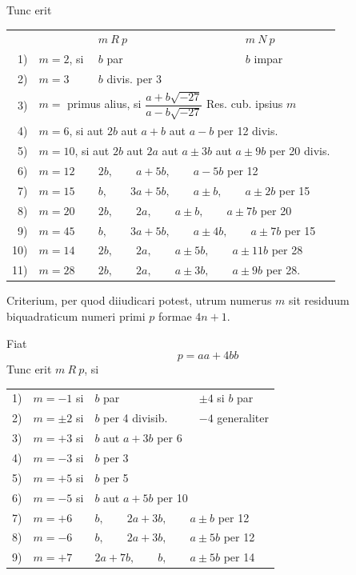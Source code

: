 \noindent\unskip{}Tunc erit
\begin{center}\footnotesize\setlength{\tabcolsep}{3pt}
\begin{tabular}{@{}rlll@{}}
& &$m\ R\ p$&$m\ N\ p$\\
1)&$m=2$, si&$b$ par&$b$ impar\\
2)&$m=3$&$b$ divis. per 3&\\
3)&\multicolumn{3}{l}{$m={}$ primus alius, si $\dfrac{a+b\sqrt{-27}}{a-b\sqrt{-27}}$ Res. cub. ipsius $m$}\\[5pt]
4)&\multicolumn{3}{l}{$m=6$, si aut $2b$ aut $a+b$ aut $a-b$ per 12 divis.}\\
5)&\multicolumn{3}{l}{$m=10$, si aut $2b$ aut $2a$ aut $a\pm3b$ aut $a\pm9b$ per 20 divis.}\\
6)&$m=12$&\multicolumn{2}{l}{$2b,\qquad a+5b,\qquad a-5b$ per 12}\\
7)&$m=15$&\multicolumn{2}{l}{$b,\qquad 3a+5b,\qquad a\pm b,\qquad a\pm2b$ per 15}\\
8)&$m=20$&\multicolumn{2}{l}{$2b,\qquad2a,\qquad a\pm b,\qquad a\pm7b$ per 20}\\
9)&$m=45$&\multicolumn{2}{l}{$b,\qquad3a+5b,\qquad a\pm4b,\qquad a\pm7b$ per 15}\\
10)&$m=14$&\multicolumn{2}{l}{$2b,\qquad2a,\qquad a\pm5b,\qquad a\pm11b$ per 28}\\
11)&$m=28$&\multicolumn{2}{l}{$2b,\qquad2a,\qquad a\pm3b,\qquad a\pm9b$ per 28.}
\end{tabular}\end{center}
\medskip
\par\noindent\hspace*{\parindent}Criterium, per quod diiudicari potest, utrum numerus $m$ sit residuum biquadraticum numeri primi $p$ formae $4n+1$.

Fiat
\[p=aa+4bb\]
\noindent Tunc erit $m\ R\ p$, si
\begin{center}\small\setlength{\tabcolsep}{3pt}\begin{tabular}{@{}rlll@{}}
1)&$m=-1$ si&$b$ par&$\pm4$ si $b$ par\\
2)&$m=\pm2$ si&$b$ per 4 divisib.&$-4$ generaliter\\
3)&$m=+3$ si&$b$ aut $a+3b$ per 6&\\
4)&$m=-3$ si&$b$ per 3&\\
5)&$m=+5$ si&$b$ per 5&\\
6)&$m=-5$ si&$b$ aut $a+5b$ per 10&\\
7)&$m=+6$&\multicolumn{2}{l}{$b,\qquad2a+3b,\qquad a\pm b$ per 12}\\
8)&$m=-6$&\multicolumn{2}{l}{$b,\qquad2a+3b,\qquad a\pm5b$ per 12}\\
9)&$m=+7$&\multicolumn{2}{l}{$2a+7b,\qquad b,\qquad a\pm5b$ per 14}
\end{tabular}\end{center}
